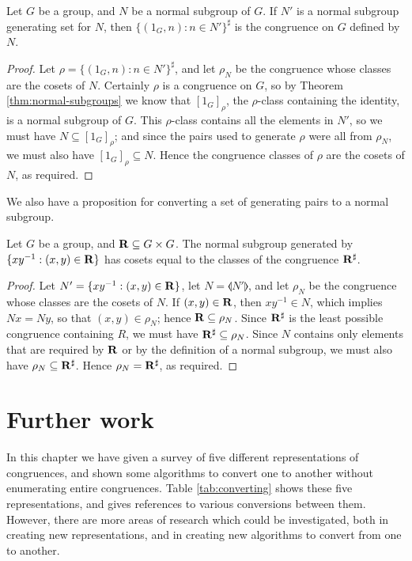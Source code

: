 \begin{proposition}
  \label{prop:normal-subgroup-to-genpairs}
  Let $G$ be a group, and $N$ be a normal subgroup of $G$.  If $N'$ is a
  normal subgroup generating set for $N$, then $\{(1_G, n) : n \in N'\}^\sharp$
  is the congruence on $G$ defined by $N$.
  \begin{proof}
    Let $\rho = \{(1_G, n) : n \in N'\}^\sharp$, and let $\rho_N$ be the
    congruence whose classes are the cosets of $N$.  Certainly $\rho$ is a
    congruence on $G$, so by Theorem \ref{thm:normal-subgroups} we know that
    $[1_G]_\rho$, the $\rho$-class containing the identity, is a normal subgroup
    of $G$.  This $\rho$-class contains all the elements in $N'$, so we must
    have $N \subseteq [1_G]_\rho$; and since the pairs used to generate $\rho$
    were all from $\rho_N$, we must also have $[1_G]_\rho \subseteq N$.  Hence
    the congruence classes of $\rho$ are the cosets of $N$, as required.
  \end{proof}
\end{proposition}

We also have a proposition for converting a set of generating pairs to a normal
subgroup.

\begin{proposition}
  \label{prop:genpairs-to-normal-subgroup}
  Let $G$ be a group, and $\mathbf{R} \subseteq G \times G$.  The normal subgroup
  generated by $\{xy^{-1} : (x,y) \in \mathbf{R}\}$ has cosets equal to the classes of
  the congruence $\mathbf{R}^\sharp$.
  \begin{proof}
    Let $N' = \{xy^{-1} : (x,y) \in \mathbf{R}\}$, let $N = \llangle N' \rrangle$, and
    let $\rho_N$ be the congruence whose classes are the cosets of $N$.  If
    $(x,y) \in \mathbf{R}$, then $xy^{-1} \in N$, which implies $Nx=Ny$, so that
    $(x,y) \in \rho_N$; hence $\mathbf{R} \subseteq \rho_N$.  Since $\mathbf{R}^\sharp$ is the least
    possible congruence containing $R$, we must have $\mathbf{R}^\sharp \subseteq \rho_N$.
    Since $N$ contains only elements that are required by $\mathbf{R}$ or by the
    definition of a normal subgroup, we must also have $\rho_N \subseteq \mathbf{R}^\sharp$.
    Hence $\rho_N = \mathbf{R}^\sharp$, as required.
  \end{proof}
\end{proposition}

\section{Further work}
\label{sec:converting-further-work}

In this chapter we have given a survey of five different representations of
congruences, and shown some algorithms to convert one to another without
enumerating entire congruences.  Table \ref{tab:converting} shows these five
representations, and gives references to various conversions between them.
However, there are more areas of research which could be investigated, both in
creating new representations, and in creating new algorithms to convert from one
to another.

